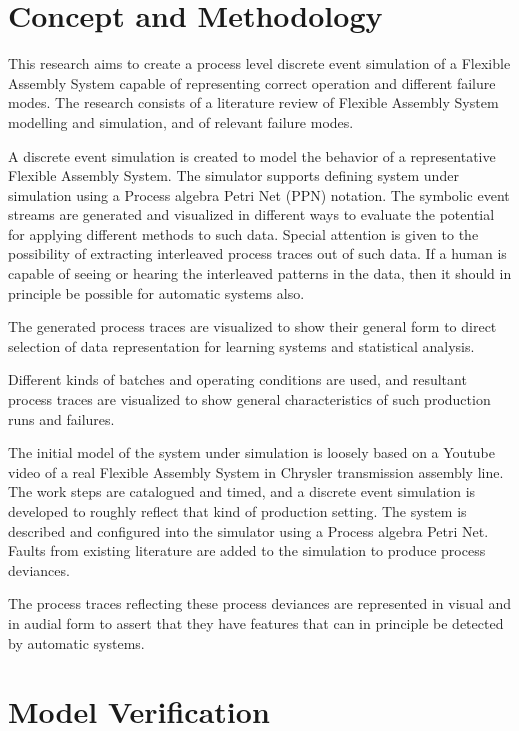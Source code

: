 \documentclass[a4paper,12pt]{article}
\begin{document}
\section{Concept and Methodology}

This research aims to create a process level discrete event simulation of a Flexible Assembly System capable of representing correct operation and different failure modes.
The research consists of a literature review of Flexible Assembly System modelling and simulation, and of relevant failure modes.

A discrete event simulation is created to model the behavior of a representative Flexible Assembly System. The simulator supports defining system under simulation using
a Process algebra Petri Net (PPN) notation.
The symbolic event streams are generated and visualized in different ways
to evaluate the potential for applying different methods to such data. Special attention is given to the possibility of extracting interleaved process traces out of such data.
If a human is capable of seeing or hearing the interleaved patterns in the data, then it should in principle be possible for automatic systems also.

The generated process traces are visualized to show their general form to direct selection of data representation for learning systems and statistical analysis.

Different kinds of batches and operating conditions are used, and resultant process traces are visualized to show general characteristics of such production runs and failures.

The initial model of the system under simulation is loosely based on a Youtube video\cite{transmission} of a real Flexible Assembly System in Chrysler transmission assembly line.
The work steps are catalogued and timed, and a discrete event simulation
is developed to roughly reflect that kind of production setting. The system is described and configured into the simulator using a Process algebra Petri Net.
Faults from existing literature are added to the simulation to produce process deviances.

The process traces reflecting these process deviances are represented in visual and in audial form to assert that they have features that can in principle be detected
by automatic systems.

\section{Model Verification}
\end{document}
